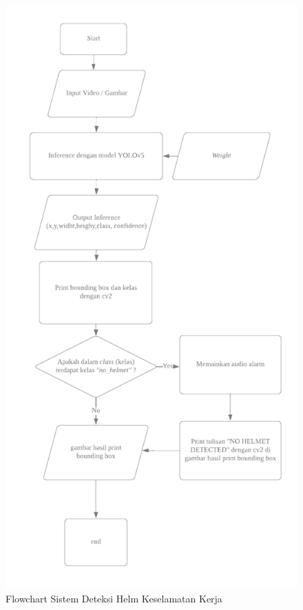 \begin{figure}[ht]
  \centering
  \includegraphics[scale=0.4]{gambar/flowchart_sistem.png}
  \caption{Flowchart Sistem Deteksi Helm Keselamatan Kerja}
  \label{fig:flchartdeteksi}  
\end{figure}

